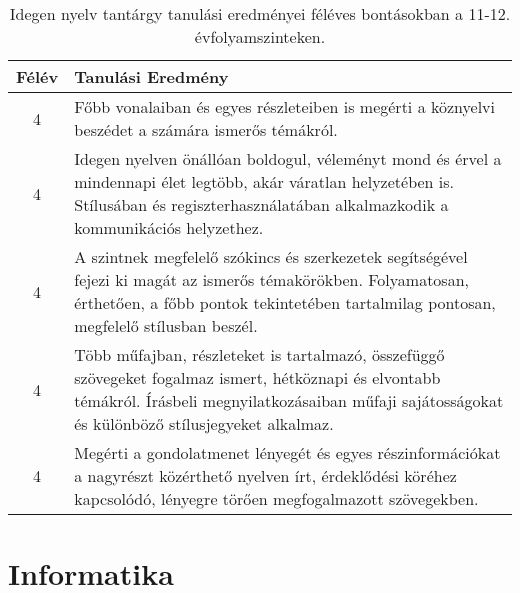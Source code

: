        
           \begin{longtable}{c | p{} }
            \caption[Idegen nyelv 11-12.]{Idegen nyelv tantárgy tanulási eredményei féléves bontásokban a 11-12. évfolyamszinteken. }  \\

            \textbf{Félév} & \textbf{Tanulási Eredmény} \\
            \hline
            \endhead
                                
                                          4 &  Főbb vonalaiban és egyes részleteiben is megérti a köznyelvi beszédet a számára ismerős témákról. \\ \hline
                                          4 &  Idegen nyelven önállóan boldogul, véleményt mond és érvel a mindennapi élet legtöbb, akár váratlan helyzetében is. Stílusában és regiszterhasználatában alkalmazkodik a kommunikációs helyzethez. \\ \hline
                                          4 &  A szintnek megfelelő szókincs és szerkezetek segítségével fejezi ki magát az ismerős témakörökben. Folyamatosan, érthetően, a főbb pontok tekintetében tartalmilag pontosan, megfelelő stílusban beszél. \\ \hline
                                          4 &  Több műfajban, részleteket is tartalmazó, összefüggő szövegeket fogalmaz ismert, hétköznapi és elvontabb témákról. Írásbeli megnyilatkozásaiban műfaji sajátosságokat és különböző stílusjegyeket alkalmaz. \\ \hline
                                          4 &  Megérti a gondolatmenet lényegét és egyes részinformációkat a nagyrészt közérthető nyelven írt, érdeklődési köréhez kapcsolódó, lényegre törően megfogalmazott szövegekben. \\ \hline
                                      
                        \end{longtable}
            \clearpage

        \section{Informatika}

